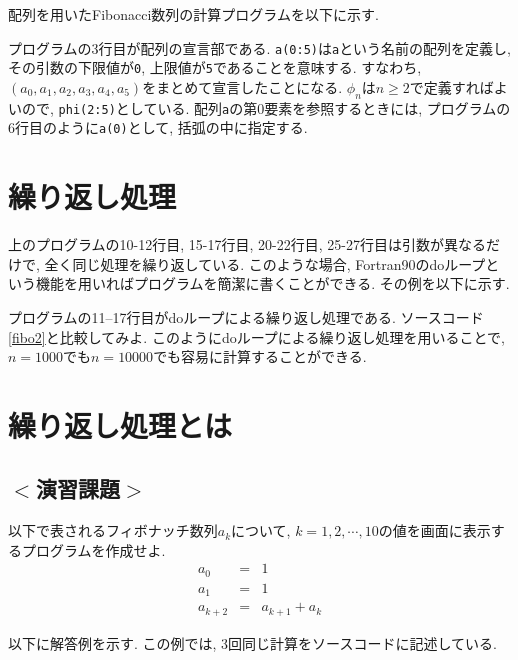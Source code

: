 配列を用いたFibonacci数列の計算プログラムを以下に示す.


プログラムの3行目が配列の宣言部である.
\verb|a(0:5)|は\verb|a|という名前の配列を定義し, その引数の下限値が\verb|0|, 上限値が\verb|5|であることを意味する.
すなわち, $(a_0, a_1, a_2, a_3, a_4, a_5)$をまとめて宣言したことになる.
$\phi_n$は$n\ge2$で定義すればよいので, \verb|phi(2:5)|としている.
配列\verb|a|の第0要素を参照するときには, プログラムの6行目のように\verb|a(0)|として,
括弧の中に指定する.


\section{繰り返し処理}
上のプログラムの10-12行目, 15-17行目, 20-22行目, 25-27行目は引数が異なるだけで,
全く同じ処理を繰り返している.
このような場合, Fortran90のdoループという機能を用いればプログラムを簡潔に書くことができる.
その例を以下に示す.

プログラムの11--17行目がdoループによる繰り返し処理である.
ソースコード\ref{fibo2}と比較してみよ.
このようにdoループによる繰り返し処理を用いることで, $n=1000$でも$n=10000$でも容易に計算することができる.





\section{繰り返し処理とは}
\subsection*{$<$演習課題$>$}
以下で表されるフィボナッチ数列$a_k$について, $k=1,2, \cdots, 10$の値を画面に表示するプログラムを作成せよ.  \\
\begin{eqnarray}
a_0 &=& 1 \\
a_1 &=& 1 \\
a_{k+2} &=& a_{k+1} + a_k
\end{eqnarray}

以下に解答例を示す.
この例では, 3回同じ計算をソースコードに記述している.



